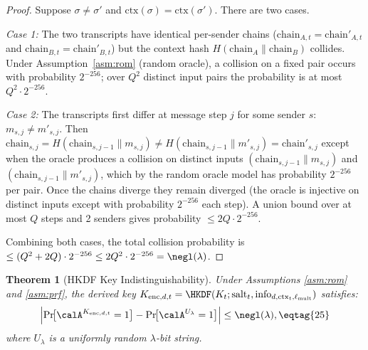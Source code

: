 \documentclass[11pt,letterpaper]{article}
\newtheorem{theorem}{Theorem}[section]
\begin{document}
\begin{proof}
Suppose $\sigma \neq \sigma'$ and $\mathrm{ctx}(\sigma) = \mathrm{ctx}(\sigma')$.
There are two cases.

\textit{Case 1:} The two transcripts have identical per-sender chains
($\mathrm{chain}_{A,t} = \mathrm{chain}'_{A,t}$ and
$\mathrm{chain}_{B,t} = \mathrm{chain}'_{B,t}$) but the context hash
$H(\mathrm{chain}_A \| \mathrm{chain}_B)$ collides.
Under Assumption~\ref{asm:rom} (random oracle), a collision on a fixed
pair occurs with probability $2^{-256}$; over $Q^2$ distinct input pairs
the probability is at most $Q^2 \cdot 2^{-256}$.

\textit{Case 2:} The transcripts first differ at message step $j$ for some
sender $s$: $m_{s,j} \neq m'_{s,j}$.
Then $\mathrm{chain}_{s,j} = H(\mathrm{chain}_{s,j-1}\|m_{s,j}) \neq
H(\mathrm{chain}_{s,j-1}\|m'_{s,j}) = \mathrm{chain}'_{s,j}$
except when the oracle produces a collision on distinct inputs
$(\mathrm{chain}_{s,j-1}\|m_{s,j})$ and $(\mathrm{chain}_{s,j-1}\|m'_{s,j})$,
which by the random oracle model has probability $2^{-256}$ per pair.
Once the chains diverge they remain diverged (the oracle is injective on
distinct inputs except with probability $2^{-256}$ each step).
A union bound over at most $Q$ steps and 2 senders gives
probability $\leq 2Q \cdot 2^{-256}$.

Combining both cases, the total collision probability is
$\leq (Q^2 + 2Q) \cdot 2^{-256} \leq 2Q^2 \cdot 2^{-256} = \negl(\lambda)$.
\end{proof}

\begin{theorem}[HKDF Key Indistinguishability]\label{thm:hkdf}
Under Assumptions \ref{asm:rom} and \ref{asm:prf},
the derived key $K_{\mathrm{enc},d,t} = \HKDF(K_t; \mathrm{salt}_t,
\mathrm{info}_{d,\mathrm{ctx}_t,\ell_{\mathrm{mult}}})$ satisfies:
\[
  \Bigl|\Pr\!\bigl[\calA^{K_{\mathrm{enc},d,t}}=1\bigr]
    - \Pr\!\bigl[\calA^{U_\lambda}=1\bigr]\Bigr|
  \leq \negl(\lambda), \eqtag{25}
\]
where $U_\lambda$ is a uniformly random $\lambda$-bit string.
\end{theorem}
\end{document}
